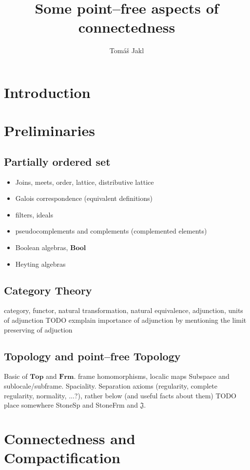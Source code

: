 \documentclass[12pt,a4paper,fleqn]{report}
\title{Some point--free aspects of connectedness}
\author{Tom\'a\v s Jakl}
\theoremstyle{newthmstyle}
\theoremstyle{newthmstyleNormal}
\newcommand\categoryStyle[1]{\ensuremath{\mathbf{#1}}}
\newcommand\Frm{\categoryStyle{Frm}}
\newcommand\Top{\categoryStyle{Top}}
\newcommand\Bool{\categoryStyle{Bool}}
\newcommand\J{\ensuremath{\mathfrak{J}}}
\begin{document}
\maketitle
\tableofcontents


\chapter{Introduction}
\cite{picado2011frames}

\chapter{Preliminaries}
\section{Partially ordered set}
\begin{itemize}
    \item Joins, meets, order, lattice, distributive lattice
    \item Galois correspondence (equivalent definitions)
    \item filters, ideals
    \item pseudocomplements and complements (complemented elements)
    \item Boolean algebras, \Bool
    \item Heyting algebras
\end{itemize}
\section{Category Theory}
category, functor, natural transformation, natural equivalence, adjunction, units of adjunction
TODO exmplain importance of adjunction by mentioning the limit preserving of adjuction

\section{Topology and point--free Topology}
Basic of \Top{} and \Frm.
frame homomorphisms, localic maps
Subspace and sublocale/subframe.
Spaciality.
Separation axioms (regularity, complete regularity, normality, ...?), rather below (and useful facts about them)
TODO place somewhere StoneSp and StoneFrm and \J.

\chapter{Connectedness and Compactification}
\end{document}
